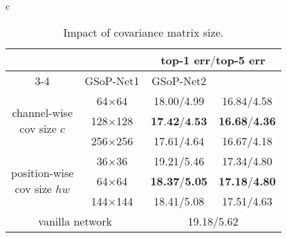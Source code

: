 \documentclass[10pt,twocolumn,letterpaper]{article}
\begin{document}
\begin{table}[htb!]
	\centering
	\setlength{\tabcolsep}{2pt}
	\footnotesize
	\renewcommand\arraystretch{1.3}
	\begin{tabular}{c}
		\begin{minipage}{1\linewidth}
			\begin{subtable}{1\linewidth}
				\centering
				\footnotesize
				\setlength{\tabcolsep}{6pt}
				\begin{tabular}{c|c|c|c}
					\hline
					\multicolumn{2}{c|}{\multirow{2}{*}{}} & \multicolumn{2}{c}{top-1 err$/$top-5 err}\\
					\cline{3-4}%
					\multicolumn{2}{c|}{}  &GSoP-Net1 &GSoP-Net2\\ 
					\hline
					\multirow{3}{*}{\parbox{0.6in}{\centering channel-wise\\cov size $c$}}& 64$\times$64 & 18.00$/$4.99 & 16.84$/$4.58 \\						
					& 128$\times$128 & $\textbf{17.42}$/$\textbf{4.53}$ & \textbf{16.68}$/$\textbf{4.36} \\
					& 256$\times$256 & 17.61$/$4.64  & 16.67$/$4.18 \\
					\hline
					\multirow{3}{*}{\parbox{0.6in}{\centering position-wise\\cov size $hw$}}& 36$\times$36 & 19.21$/$5.46 & 17.34$/$4.80 \\						
					& 64$\times$64 & \textbf{18.37}$/$\textbf{5.05} & \textbf{17.18}$/$\textbf{4.80} \\
					& 144$\times$144 & 18.41$/$5.08 & 17.51$/$4.63 \\
					\hline
					\multicolumn{2}{c|}{vanilla network}  & \multicolumn{2}{c}{19.18$/$5.62}\\	
					\hline		
				\end{tabular}%
				\setlength{\abovecaptionskip}{1.5pt}
				\setlength{\belowcaptionskip}{4pt}
				\caption{Impact of covariance matrix  size.}\label{subtab:cov-size}
				
			\end{subtable}%
		\end{minipage} \\
		

\end{tabular}
\end{table}
\end{document}
